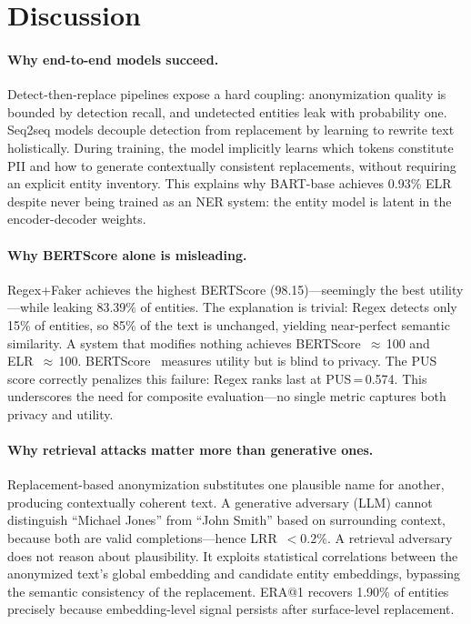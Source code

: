 \documentclass[10pt,twocolumn]{article}
\begin{document}
\section{Discussion}\label{sec:discussion}

\paragraph{Why end-to-end models succeed.}
Detect-then-replace pipelines expose a hard coupling: anonymization quality is bounded by detection recall, and undetected entities leak with probability one.
Seq2seq models decouple detection from replacement by learning to rewrite text holistically.
During training, the model implicitly learns which tokens constitute PII and how to generate contextually consistent replacements, without requiring an explicit entity inventory.
This explains why BART-base achieves 0.93\% ELR despite never being trained as an NER system: the entity model is latent in the encoder-decoder weights.

\paragraph{Why BERTScore alone is misleading.}
Regex+Faker achieves the highest BERTScore (98.15)---seemingly the best utility---while leaking 83.39\% of entities.
The explanation is trivial: Regex detects only 15\% of entities, so 85\% of the text is unchanged, yielding near-perfect semantic similarity.
A system that modifies nothing achieves BERTScore~$\approx$\,100 and ELR~$\approx$\,100.
BERTScore~\citep{zhang2020bertscore} measures utility but is blind to privacy.
The PUS score correctly penalizes this failure: Regex ranks last at PUS\,=\,0.574.
This underscores the need for composite evaluation---no single metric captures both privacy and utility.

\paragraph{Why retrieval attacks matter more than generative ones.}
Replacement-based anonymization substitutes one plausible name for another, producing contextually coherent text.
A generative adversary (LLM) cannot distinguish ``Michael Jones'' from ``John Smith'' based on surrounding context, because both are valid completions---hence LRR~$< 0.2\%$.
A retrieval adversary does not reason about plausibility.
It exploits statistical correlations between the anonymized text's global embedding and candidate entity embeddings, bypassing the semantic consistency of the replacement.
ERA@1 recovers 1.90\% of entities precisely because embedding-level signal persists after surface-level replacement.
\end{document}
